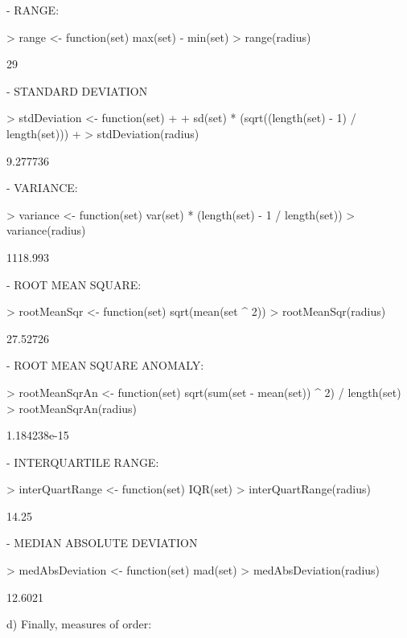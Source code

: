 \documentclass[a4paper]{article}
\begin{document}
			- RANGE:
\begin{Schunk}
\begin{Sinput}
> range <- function(set) {max(set) - min(set)}
> range(radius)
\end{Sinput}
\begin{Soutput}
[1] 29
\end{Soutput}
\end{Schunk}
			- STANDARD DEVIATION
\begin{Schunk}
\begin{Sinput}
> stdDeviation <- function(set) 
+ {
+    sd(set) * (sqrt((length(set) - 1) / length(set)))
+ }
> stdDeviation(radius)
\end{Sinput}
\begin{Soutput}
[1] 9.277736
\end{Soutput}
\end{Schunk}
			- VARIANCE:
\begin{Schunk}
\begin{Sinput}
> variance <- function(set) {var(set) * (length(set) - 1 / length(set))} 
> variance(radius)
\end{Sinput}
\begin{Soutput}
[1] 1118.993
\end{Soutput}
\end{Schunk}
			- ROOT MEAN SQUARE: 
\begin{Schunk}
\begin{Sinput}
> rootMeanSqr <- function(set) {sqrt(mean(set ^ 2))}
> rootMeanSqr(radius)
\end{Sinput}
\begin{Soutput}
[1] 27.52726
\end{Soutput}
\end{Schunk}
			- ROOT MEAN SQUARE ANOMALY:
\begin{Schunk}
\begin{Sinput}
> rootMeanSqrAn <- function(set) {sqrt(sum(set - mean(set)) ^ 2) / length(set)}
> rootMeanSqrAn(radius)
\end{Sinput}
\begin{Soutput}
[1] 1.184238e-15
\end{Soutput}
\end{Schunk}
			- INTERQUARTILE RANGE:
\begin{Schunk}
\begin{Sinput}
> interQuartRange <- function(set) {IQR(set)}
> interQuartRange(radius)
\end{Sinput}
\begin{Soutput}
[1] 14.25
\end{Soutput}
\end{Schunk}
			- MEDIAN ABSOLUTE DEVIATION
\begin{Schunk}
\begin{Sinput}
> medAbsDeviation <- function(set) {mad(set)}
> medAbsDeviation(radius)
\end{Sinput}
\begin{Soutput}
[1] 12.6021
\end{Soutput}
\end{Schunk}
		d) Finally, measures of order:
		
\end{document}
